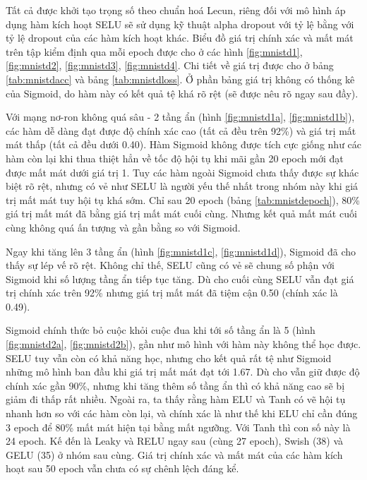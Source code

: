 Tất cả được khởi tạo trọng số theo chuẩn hoá Lecun, riêng đối với mô hình áp dụng hàm kích hoạt SELU sẽ sử dụng kỹ thuật alpha dropout với tỷ lệ bằng với tỷ lệ dropout của các hàm kích hoạt khác.
Biểu đồ giá trị chính xác và mất mát trên tập kiểm định qua mỗi epoch được cho ở các hình \ref{fig:mnistd1}, \ref{fig:mnistd2}, \ref{fig:mnistd3}, \ref{fig:mnistd4}.
Chi tiết về giá trị được cho ở bảng \ref{tab:mnistdacc} và bảng \ref{tab:mnistdloss}.
Ở phần bảng giá trị không có thống kê của Sigmoid, do hàm này có kết quả tệ khá rõ rệt (sẽ được nêu rõ ngay sau đầy).
\vspace{5pt}

Với mạng nơ-ron không quá sâu - 2 tầng ẩn (hình \ref{fig:mnistd1a}, \ref{fig:mnistd1b}), các hàm dễ dàng đạt được độ chính xác cao (tất cả đều trên 92\%) và giá trị mất mát thấp (tất cả đều dưới 0.40).
Hàm Sigmoid không được tích cực giống như các hàm còn lại khi thua thiệt hẳn về tốc độ hội tụ khi mãi gần 20 epoch mới đạt được mất mát dưới giá trị 1.
Tuy các hàm ngoài Sigmoid chưa thấy được sự khác biệt rõ rệt, nhưng có vẻ như SELU là người yếu thế nhất trong nhóm này khi giá trị mất mát tuy hội tụ khá sớm.
Chỉ sau 20 epoch (bảng \ref{tab:mnistdepoch}), 80\% giá trị mất mát đã bằng giá trị mất mát cuối cùng.
Nhưng kết quả mất mát cuối cùng không quá ấn tượng và gần bằng so với Sigmoid.
\vspace{5pt}

Ngay khi tăng lên 3 tầng ẩn (hình \ref{fig:mnistd1c}, \ref{fig:mnistd1d}), Sigmoid đã cho thấy sự lép vế rõ rệt.
Không chỉ thế, SELU cũng có vẻ sẽ chung số phận với Sigmoid khi số lượng tầng ẩn tiếp tục tăng.
Dù cho cuối cùng SELU vẫn đạt giá trị chính xác trên 92\% nhưng giá trị mất mát đã tiệm cận 0.50 (chính xác là 0.49).
\vspace{5pt}

Sigmoid chính thức bỏ cuộc khỏi cuộc đua khi tới số tầng ẩn là 5 (hình \ref{fig:mnistd2a}, \ref{fig:mnistd2b}), gần như mô hình với hàm này không thể học được.
SELU tuy vẫn còn có khả năng học, nhưng cho kết quả rất tệ như Sigmoid những mô hình ban đầu khi giá trị mất mát đạt tới 1.67.
Dù cho vẫn giữ được độ chính xác gần 90\%, nhưng khi tăng thêm số tầng ẩn thì có khả năng cao sẽ bị giảm đi thấp rất nhiều.
Ngoài ra, ta thấy rằng hàm ELU và Tanh có vẽ hội tụ nhanh hơn so với các hàm còn lại, và chính xác là như thế khi ELU chỉ cần đúng 3 epoch để 80\% mất mát hiện tại bằng mất ngưỡng.
Với Tanh thì con số này là 24 epoch.
Kế đến là Leaky và RELU ngay sau (cùng 27 epoch), Swish (38) và GELU (35) ở nhóm sau cùng.
Giá trị chính xác và mất mát của các hàm kích hoạt sau 50 epoch vẫn chưa có sự chênh lệch đáng kể.
\vspace{5pt}

